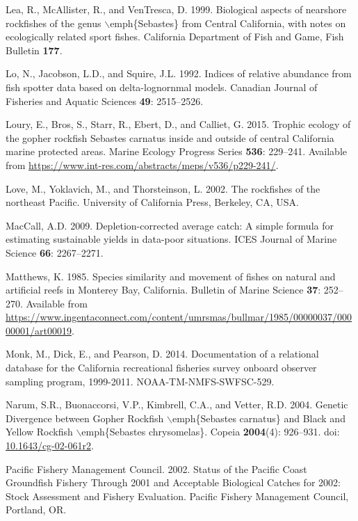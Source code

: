 \documentclass[12pt,]{article}
\begin{document}
\hypertarget{ref-Lea1999}{}
Lea, R., McAllister, R., and VenTresca, D. 1999. Biological aspects of
nearshore rockfishes of the genus \(\backslash\)emph\{Sebastes\} from
Central California, with notes on ecologically related sport fishes.
California Department of Fish and Game, Fish Bulletin \textbf{177}.

\hypertarget{ref-Lo1992}{}
Lo, N., Jacobson, L.D., and Squire, J.L. 1992. Indices of relative
abundance from fish spotter data based on delta-lognornmal models.
Canadian Journal of Fisheries and Aquatic Sciences \textbf{49}:
2515--2526.

\hypertarget{ref-Loury2015}{}
Loury, E., Bros, S., Starr, R., Ebert, D., and Calliet, G. 2015. Trophic
ecology of the gopher rockfish Sebastes carnatus inside and outside of
central California marine protected areas. Marine Ecology Progress
Series \textbf{536}: 229--241. Available from
\url{https://www.int-res.com/abstracts/meps/v536/p229-241/}.

\hypertarget{ref-Love2002}{}
Love, M., Yoklavich, M., and Thorsteinson, L. 2002. The rockfishes of
the northeast Pacific. University of California Press, Berkeley, CA,
USA.

\hypertarget{ref-MacCall2009}{}
MacCall, A.D. 2009. Depletion-corrected average catch: A simple formula
for estimating sustainable yields in data-poor situations. ICES Journal
of Marine Science \textbf{66}: 2267--2271.

\hypertarget{ref-Matthews1985}{}
Matthews, K. 1985. Species similarity and movement of fishes on natural
and artificial reefs in Monterey Bay, California. Bulletin of Marine
Science \textbf{37}: 252--270. Available from
\url{https://www.ingentaconnect.com/content/umrsmas/bullmar/1985/00000037/00000001/art00019}.

\hypertarget{ref-Monk2014}{}
Monk, M., Dick, E., and Pearson, D. 2014. Documentation of a relational
database for the California recreational fisheries survey onboard
observer sampling program, 1999-2011. NOAA-TM-NMFS-SWFSC-529.

\hypertarget{ref-Narum2004}{}
Narum, S.R., Buonaccorsi, V.P., Kimbrell, C.A., and Vetter, R.D. 2004.
Genetic Divergence between Gopher Rockfish \(\backslash\)emph\{Sebastes
carnatus\} and Black and Yellow Rockfish \(\backslash\)emph\{Sebastes
chrysomelas\}. Copeia \textbf{2004}(4): 926--931. doi:
\href{https://doi.org/10.1643/cg-02-061r2}{10.1643/cg-02-061r2}.

\hypertarget{ref-PFMC2002}{}
Pacific Fishery Management Council. 2002. Status of the Pacific Coast
Groundfish Fishery Through 2001 and Acceptable Biological Catches for
2002: Stock Assessment and Fishery Evaluation. Pacific Fishery
Management Council, Portland, OR.
\end{document}
